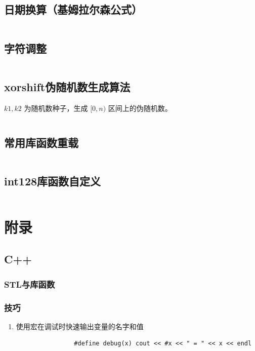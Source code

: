 \documentclass[a4paper, twoside]{article}
\begin{document}
    \subsection{日期换算（基姆拉尔森公式）}
    \inputminted{cpp}{../src/杂项/日期换算（基姆拉尔森公式）.cpp}

    \subsection{字符调整}
    \inputminted{cpp}{../src/杂项/字符调整.cpp}

    \subsection{xorshift伪随机数生成算法}
    $k1, k2$ 为随机数种子，生成 $[0, n)$ 区间上的伪随机数。
    \inputminted{cpp}{../src/杂项/xorshift伪随机数生成算法.cpp}

    \subsection{常用库函数重载}
    \inputminted{cpp}{../src/杂项/常用库函数重载.cpp}

    \subsection{int128库函数自定义}
    \inputminted{cpp}{../src/杂项/int128库函数自定义.cpp}

\newpage
\section{附录}
    \subsection{C++}
        \subsubsection{STL与库函数}

        \subsubsection{技巧}
        \begin{enumerate}
            \item 使用宏在调试时快速输出变量的名字和值
            \begin{verbatim}
                #define debug(x) cout << #x << " = " << x << endl
            \end{verbatim}
        \end{enumerate}
        
\end{document}
